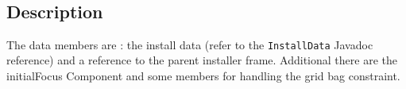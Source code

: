 \begin{center}
\end{center}\

\subsection{Description}

The data members are : the install data (refer to the \texttt{InstallData}
Javadoc reference) and a reference to the parent installer frame.
Additional there are the initialFocus Component and some members for
handling the grid bag constraint.\\

